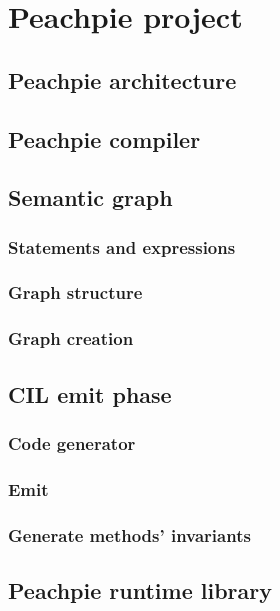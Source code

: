 \chapter{Peachpie project}

\section{Peachpie architecture}

\section{Peachpie compiler}

\section{Semantic graph}

\subsection{Statements and expressions}

\subsection{Graph structure}

\subsection{Graph creation}

\section{CIL emit phase}

\subsection{Code generator}

\subsection{Emit}

\subsection{Generate methods’ invariants}

\section{Peachpie runtime library}